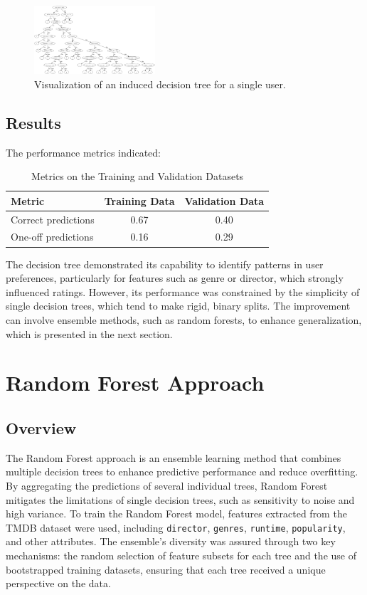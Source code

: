 \documentclass[a4paper,9pt]{article}
\begin{document}
\begin{figure}[h!]
	\centering
	\includegraphics[width=0.4\textwidth]{tree}
	\caption{Visualization of an induced decision tree for a single user.}
	\label{fig:decision_tree}
\end{figure}

\subsection{Results}
The performance metrics indicated:

\begin{table}[ht]
	\centering
	\begin{tabular}{|l|c|c|}
		\hline
		\textbf{Metric}     & \textbf{Training Data} & \textbf{Validation Data} \\ \hline
		Correct predictions & 0.67                   & 0.40                     \\ \hline
		One-off predictions & 0.16                   & 0.29                     \\ \hline
	\end{tabular}
	\caption{Metrics on the Training and Validation Datasets}
	\label{tab:decision_tree_results}
\end{table}

The decision tree demonstrated its capability to identify patterns in user preferences,
particularly for features such as genre or director, which strongly influenced ratings.
However, its performance was constrained by the simplicity of single decision trees, which tend to make rigid,
binary splits.
The improvement can involve ensemble methods, such as random forests, to enhance generalization,
which is presented in the next section.

\clearpage
\section{Random Forest Approach}
\subsection{Overview}
The Random Forest approach is an ensemble learning method that combines multiple decision trees
to enhance predictive performance and reduce overfitting.
By aggregating the predictions of several individual trees, Random Forest mitigates the limitations of
single decision trees, such as sensitivity to noise and high variance.
To train the Random Forest model, features extracted from the TMDB dataset were used, including \texttt{director},
\texttt{genres}, \texttt{runtime}, \texttt{popularity}, and other attributes.
The ensemble's diversity was assured through two key mechanisms: the random selection of feature
subsets for each tree and the use of bootstrapped training datasets, ensuring that each tree received
a unique perspective on the data.
\end{document}
